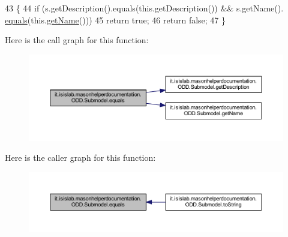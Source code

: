 \begin{DoxyCode}
43                                      \{
44         \textcolor{keywordflow}{if} (s.getDescription().equals(this.getDescription()) && s.getName().
      \hyperlink{classit_1_1isislab_1_1masonhelperdocumentation_1_1_o_d_d_1_1_submodel_a2bb03f7d258a5e882219eaf7dd3b8257}{equals}(this.\hyperlink{classit_1_1isislab_1_1masonhelperdocumentation_1_1_o_d_d_1_1_submodel_a25ea4ffe85d1b3ce42d22160e573cb50}{getName}()))
45             \textcolor{keywordflow}{return} \textcolor{keyword}{true};
46         \textcolor{keywordflow}{return} \textcolor{keyword}{false};
47     \}
\end{DoxyCode}


Here is the call graph for this function\-:\nopagebreak
\begin{figure}[H]
\begin{center}
\leavevmode
\includegraphics[width=350pt]{classit_1_1isislab_1_1masonhelperdocumentation_1_1_o_d_d_1_1_submodel_a2bb03f7d258a5e882219eaf7dd3b8257_cgraph}
\end{center}
\end{figure}




Here is the caller graph for this function\-:\nopagebreak
\begin{figure}[H]
\begin{center}
\leavevmode
\includegraphics[width=350pt]{classit_1_1isislab_1_1masonhelperdocumentation_1_1_o_d_d_1_1_submodel_a2bb03f7d258a5e882219eaf7dd3b8257_icgraph}
\end{center}
\end{figure}


